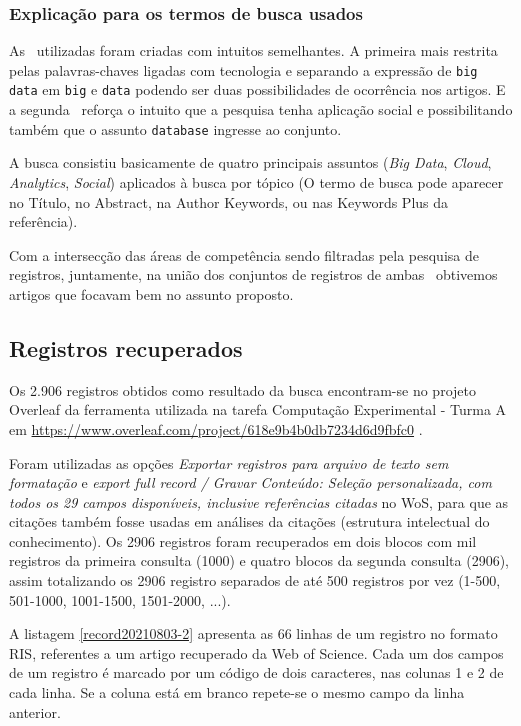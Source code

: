 \subsubsection{Explicação para os termos de busca usados\label{MASSA:query}}

As \querys\ utilizadas foram criadas com intuitos semelhantes. A primeira mais restrita pelas palavras-chaves ligadas com tecnologia e separando a expressão de \texttt{big data} em \texttt{big} e \texttt{data} podendo ser duas possibilidades de ocorrência nos artigos. E a segunda \query\ reforça o intuito que a pesquisa tenha aplicação social e possibilitando também que o assunto  \texttt{database} ingresse ao conjunto.

A busca consistiu basicamente de quatro principais assuntos (\textit{Big Data}, \textit{Cloud}, \textit{Analytics}, \textit{Social}) aplicados à busca por tópico (O termo de busca pode aparecer no Título, no Abstract, na Author Keywords, ou nas Keywords Plus da referência).

Com a intersecção das áreas de competência sendo filtradas pela pesquisa de registros, juntamente, na união dos conjuntos de registros de ambas \querys\ obtivemos artigos que focavam bem no assunto proposto.

\subsection{Registros recuperados}

Os 2.906 registros obtidos como resultado da busca encontram-se no projeto Overleaf da ferramenta utilizada na tarefa Computação Experimental - Turma A em \url{https://www.overleaf.com/project/618e9b4b0db7234d6d9fbfc0} . 

Foram utilizadas as opções \textit{Exportar registros para arquivo de texto sem formatação} e \textit{export full record / Gravar Conteúdo: Seleção personalizada, com todos os 29 campos disponíveis, inclusive referências citadas} no WoS, para que as citações também fosse usadas em análises da citações (estrutura intelectual do conhecimento). Os 2906 registros foram recuperados em dois blocos com mil registros da primeira consulta (1000) e quatro blocos da segunda consulta (2906), assim totalizando os 2906 registro  separados de até 500 registros por vez (1-500, 501-1000, 1001-1500, 1501-2000, ...).

A listagem \ref{record20210803-2} apresenta as 66 linhas de um registro no formato RIS, referentes a um artigo recuperado da Web of Science. Cada um dos campos de um registro é marcado por um código de dois caracteres, nas colunas 1 e 2 de cada linha. Se a coluna está em branco repete-se o mesmo campo da linha anterior.

